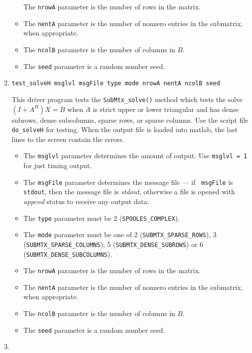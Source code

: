 \begin{enumerate}
\begin{itemize}
The {\tt nrowA} parameter is the number of rows in the matrix. 
\item
The {\tt nentA} parameter is the number of nonzero entries in the
submatrix, when appropriate.
\item
The {\tt ncolB} parameter is the number of columns in $B$.
\item
The {\tt seed} parameter is a random number seed.
\end{itemize}
\item
\begin{verbatim}
test_solveH msglvl msgFile type mode nrowA nentA ncolB seed
\end{verbatim}
This driver program tests 
the {\tt SubMtx\_solve()} method
which tests the solve
$(I + A^H)X = B$ when $A$ is strict upper or lower triangular
and has dense subrows, dense subcolumns, sparse rows, or sparse
columns.
Use the script file {\tt do\_solveH} for testing.
When the output file is loaded into matlab,
the last lines to the screen contain the errors.
\par
\begin{itemize}
\item
The {\tt msglvl} parameter determines the amount of output.
Use {\tt msglvl = 1} for just timing output.
\item
The {\tt msgFile} parameter determines the message file --- if {\tt
msgFile} is {\tt stdout}, then the message file is {\it stdout},
otherwise a file is opened with {\it append} status to receive any
output data.
\item
The {\tt type} parameter must be 2 ({\tt SPOOLES\_COMPLEX}). 
\item
The {\tt mode} parameter must be one of
2 ({\tt SUBMTX\_SPARSE\_ROWS}),
3 ({\tt SUBMTX\_SPARSE\_COLUMNS}),
5 ({\tt SUBMTX\_DENSE\_SUBROWS}) or
6 ({\tt SUBMTX\_DENSE\_SUBCOLUMNS}).
\item
The {\tt nrowA} parameter is the number of rows in the matrix. 
\item
The {\tt nentA} parameter is the number of nonzero entries in the
submatrix, when appropriate.
\item
The {\tt ncolB} parameter is the number of columns in $B$.
\item
The {\tt seed} parameter is a random number seed.
\end{itemize}
\item
\begin{verbatim}

\end{verbatim}
\end{enumerate}
